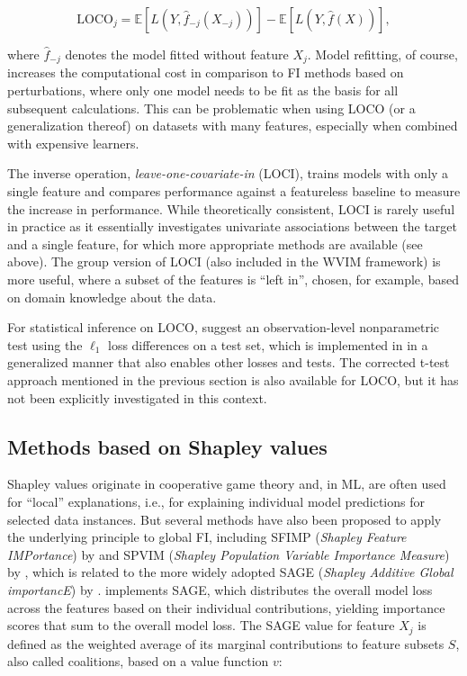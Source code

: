 \begin{equation}
\text{LOCO}_j = \mathbb{E}\left[L\left(Y, \hat{f}_{-j}(X_{-j})\right)\right] - \mathbb{E}\left[L\left(Y, \hat{f}(X)\right)\right],
\label{eq:loco}
\end{equation}

where \(\hat{f}_{-j}\) denotes the model fitted without feature \(X_j\).
Model refitting, of course, increases the computational cost in comparison to FI methods based on perturbations, where only one model needs to be fit as the basis for all subsequent calculations.
This can be problematic when using LOCO (or a generalization thereof) on datasets with many features, especially when combined with expensive learners.

The inverse operation, \emph{leave-one-covariate-in} (LOCI), trains models with only a single feature and compares performance against a featureless baseline to measure the increase in performance.
While theoretically consistent, LOCI is rarely useful in practice as it essentially investigates univariate associations between the target and a single feature, for which more appropriate methods are available (see above).
The group version of LOCI (also included in the WVIM framework) is more useful, where a subset of the features is ``left in'', chosen, for example, based on domain knowledge about the data.

For statistical inference on LOCO, \citet{lei2018distributionfreepredictivec} suggest an observation-level nonparametric test using the \(\ell_1\) loss differences on a test set, which is implemented in  in a generalized manner that also enables other losses and tests.
The corrected t-test approach mentioned in the previous section is also available for LOCO, but it has not been explicitly investigated in this context.

\subsection{Methods based on Shapley values}\label{sec-fi-shapley}

Shapley values originate in cooperative game theory \citep[see][]{shapley1953value} and, in ML, are often used for ``local'' explanations, i.e., for explaining individual model predictions for selected data instances.
But several methods have also been proposed to apply the underlying principle to global FI, including SFIMP (\emph{Shapley Feature IMPortance}) by \citet{casalicchio2019visualizingfeatureb} and SPVIM (\emph{Shapley Population Variable Importance Measure}) by \citet{williamson2020efficientnonparametrica}, which is related to the more widely adopted SAGE (\emph{Shapley Additive Global importancE}) by \citet{covert2020understandingglobalb}.
 implements SAGE, which distributes the overall model loss across the features based on their individual contributions, yielding importance scores that sum to the overall model loss.
The SAGE value for feature \(X_j\) is defined as the weighted average of its marginal contributions to feature subsets \(S\), also called coalitions, based on a value function \(v\):

